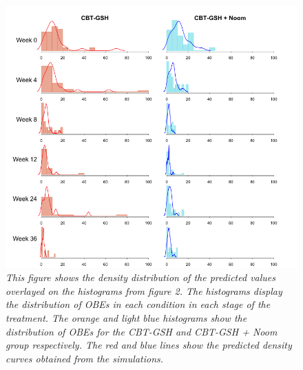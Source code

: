 \documentclass{article}
\begin{document}
\begin{figure}[H]
\centering
\includegraphics[width=\textwidth, height=\textheight, keepaspectratio]{ppc_hist_dens.png}
\caption{\emph{This figure shows the density distribution of the predicted values overlayed on the histograms from figure 2. The histograms display the distribution of OBEs in each condition in each stage of the treatment. The orange and light blue histograms show the distribution of OBEs for the CBT-GSH and CBT-GSH  + Noom group respectively. The red and blue lines show the predicted density curves obtained from the simulations.}}
\end{figure}
\end{document}
